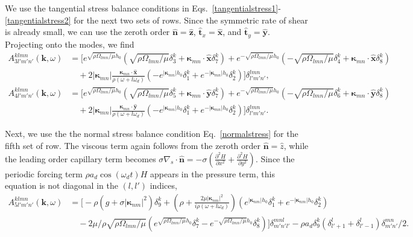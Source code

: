\documentclass[aps,pre,amsmath,amssymb,floatfix,onecolumn,notitlepage,10pt]{revtex4-1}
\begin{document}
We use the tangential stress balance conditions in Eqs.~\eqref{tangentialstress1}-\eqref{tangentialstress2} for the next two sets of rows. Since the symmetric rate of shear is already small,  we can use the zeroth order $\hat{\mathbf{n}}=\hat{\mathbf{z}}$, $\hat{\mathbf{t}}_x=\hat{\mathbf{x}}$, and $\hat{\mathbf{t}}_y=\hat{\mathbf{y}}$. Projecting onto the modes, we find
\begin{align}
A^{klmn}_{3l'm'n'}(\mathbf{k}, \omega) &=\Big[ e^{\sqrt{\rho\Omega_{lmn}/\mu}h_0}(\sqrt{\rho\Omega_{lmn}/\mu}\delta^k_3 + \bm{\kappa}_{mn}\cdot \hat{\mathbf{x}}\delta^k_7) + e^{-\sqrt{\rho\Omega_{lmn}/\mu}h_0}(-\sqrt{\rho\Omega_{lmn}/\mu}\delta^k_4 + \bm{\kappa}_{mn}\cdot \hat{\mathbf{x}}\delta^k_8) \nonumber \\
&\quad + 2|\bm{\kappa}_{mn}| \frac{\bm{\kappa}_{mn}\cdot \hat{\mathbf{x}}}{\rho(\omega + l \omega_d)} \left(-e^{|\bm{\kappa}_{mn}|h_0} \delta^k_1 + e^{-|\bm{\kappa}_{mn}|h_0} \delta^k_2 \right)\Big] \delta^{lmn}_{l'm'n'},   \\
A^{klmn}_{4l'm'n'}(\mathbf{k}, \omega)  &=  \Big[e^{\sqrt{\rho\Omega_{lmn}/\mu}h_0}(\sqrt{\rho\Omega_{lmn}/\mu}\delta^k_5 + \bm{\kappa}_{mn}\cdot \hat{\mathbf{y}}\delta^k_7) + e^{-\sqrt{\rho\Omega_{lmn}/\mu}h_0}(-\sqrt{\rho\Omega_{lmn}/\mu}\delta^k_6 + \bm{\kappa}_{mn}\cdot \hat{\mathbf{y}}\delta^k_8) \nonumber \\
&\quad + 2|\bm{\kappa}_{mn}| \frac{\bm{\kappa}_{mn}\cdot \hat{\mathbf{y}}}{\rho(\omega + l \omega_d)} \left(-e^{|\bm{\kappa}_{mn}|h_0} \delta^k_1 + e^{-|\bm{\kappa}_{mn}|h_0} \delta^k_2 \right)\Big] \delta^{lmn}_{l'm'n'}.
\end{align}

Next, we use the the normal stress balance condition Eq.~\eqref{normalstress} for the fifth set of row. The viscous term again follows from the zeroth order $\hat{\mathbf{n}}=\hat{z}$, while the leading order capillary term becomes $\sigma \nabla_s \cdot \hat{\mathbf{n}} = -\sigma \left(\frac{\partial^2 H}{\partial x^2}+\frac{\partial^2 H}{\partial y^2}\right)$. Since the periodic forcing term $\rho a_d \cos(\omega_d t)H$ appears in the pressure term, this equation is not diagonal in the $(l,l')$ indices,
\begin{align}
A^{klmn}_{5l'm'n'}(\mathbf{k}, \omega) &= \Big[ -\rho (g+\sigma|\bm{\kappa}_{nm}|^2)\delta^k_9 + \left(\rho+\frac{2\mu|\bm{\kappa}_{nm}|^2}{i\rho(\omega+l\omega_d)}\right)\left(e^{|\bm{\kappa}_{nm}|h_0}\delta^k_1 + e^{-|\bm{\kappa}_{nm}|h_0}\delta^k_2 \right) \nonumber \\
&\quad - 2\mu/\rho\sqrt{\rho\Omega_{lmn}/\mu}\left(e^{\sqrt{\rho\Omega_{lmn}/\mu}h_0}\delta^k_7 - e^{-\sqrt{\rho\Omega_{lmn}/\mu}h_0}\delta^k_8\right)\Big]\delta^{mnl}_{m'n'l'}-\rho a_d \delta^k_9 (\delta^l_{l'+1}+\delta^l_{l'-1})\delta^{mn}_{m'n'}/2.
\end{align}
\end{document}
